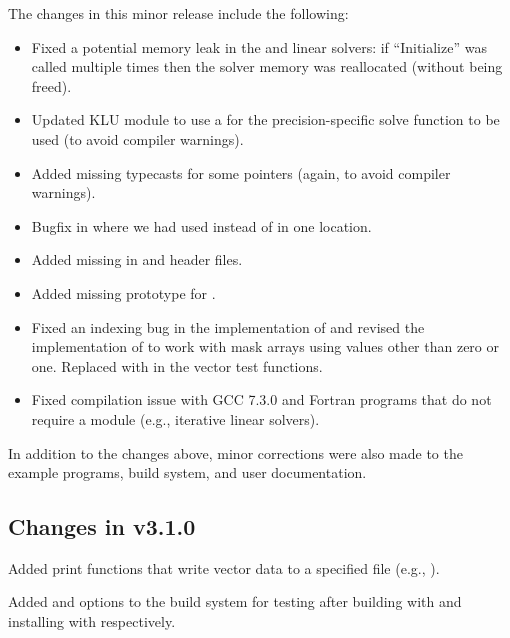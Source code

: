 The changes in this minor release include the following:
\begin{itemize}
\item Fixed a potential memory leak in the {\spgmr} and {\spfgmr} linear
  solvers: if ``Initialize'' was called multiple times then the solver
  memory was reallocated (without being freed).
  
\item Updated KLU {\sunlinsol} module to use a  for the
  precision-specific solve function to be used (to avoid compiler 
  warnings).  

\item Added missing typecasts for some  pointers (again, to
  avoid compiler warnings). 

\item Bugfix in  where we had used 
  instead of  in one location.

\item Added missing  in {\nvector} and {\sunmatrix}
  header files.

\item Added missing prototype for .

\item Fixed an indexing bug in the {\cuda} {\nvector} implementation of
   and revised the {\raja} {\nvector} implementation of
   to work with mask arrays using values other than zero or
  one. Replaced  with  in the {\raja} vector test functions.

\item Fixed compilation issue with GCC 7.3.0 and Fortran programs that do
  not require a {\sunmatrix} module (e.g., iterative linear solvers).
\end{itemize}
In addition to the changes above, minor corrections were also made to the
example programs, build system, and user documentation.

\subsection*{Changes in v3.1.0}

Added {\nvector} print functions that write vector data to a specified
file (e.g., ).

Added  and  options to the build
system for testing {\sundials} after building with  and
installing with  respectively.

